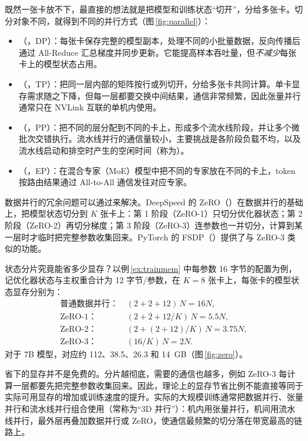 既然一张卡放不下，最直接的想法就是把模型和训练状态“切开”，分给多张卡。切分对象不同，就得到不同的并行方式（图\,\ref{fig:parallel}）：
\begin{itemize}
  \item {}（，DP）：每张卡保存完整的模型副本，处理不同的小批量数据，反向传播后通过 All-Reduce 汇总梯度并同步更新。它能提高样本吞吐量，但\emph{不减少}每张卡上的模型状态占用。
  \item {}（，TP）：把同一层内部的矩阵按行或列切开，分给多张卡共同计算\cite{shoeybi2019megatron}。单卡显存需求随之下降，但每一层都要交换中间结果，通信非常频繁，因此张量并行通常只在 NVLink 互联的单机内使用。
  \item {}（，PP）：把不同的层分配到不同的卡上，形成多个流水线阶段，并让多个微批次交错执行。流水线并行的通信量较小，主要挑战是各阶段负载不均，以及流水线启动和排空时产生的空闲时间（称为）。
  \item {}（，EP）：在混合专家（MoE）模型中把不同的专家放在不同的卡上，token 按路由结果通过 All-to-All 通信发往对应专家。
\end{itemize}



数据并行的冗余问题可以通过来解决。DeepSpeed 的 ZeRO（）\cite{rajbhandari2020zero}在数据并行的基础上，把模型状态切分到 $K$ 张卡上：第 1 阶段（ZeRO-1）只切分优化器状态；第 2 阶段（ZeRO-2）再切分梯度；第 3 阶段（ZeRO-3）连参数也一并切分，计算到某一层时才临时把完整参数收集回来。PyTorch 的 FSDP（）提供了与 ZeRO-3 类似的功能。

状态分片究竟能省多少显存？以例\,\ref{ex:trainmem} 中每参数 16 字节的配置为例，记优化器状态与主权重合计为 12 字节/参数，在 $K=8$ 张卡上，每张卡的模型状态显存分别为：
\begin{align*}
  \text{普通数据并行：} &\ (2+2+12)\,N = 16N, \\
  \text{ZeRO-1：} &\ (2+2+12/K)\,N = 5.5N, \\
  \text{ZeRO-2：} &\ (2+(2+12)/K)\,N = 3.75N, \\
  \text{ZeRO-3：} &\ (16/K)\,N = 2N.
\end{align*}
对于 7B 模型，对应约 112、38.5、26.3 和 \SI{14}{GB}（图\,\ref{fig:zero}）。



省下的显存并不是免费的。分片越彻底，需要的通信也越多，例如 ZeRO-3 每计算一层都要先把完整参数收集回来。因此，理论上的显存节省比例不能直接等同于实际可用显存的增加或训练速度的提升。实际的大规模训练通常把数据并行、张量并行和流水线并行组合使用（常称为“3D 并行”）：机内用张量并行，机间用流水线并行，最外层再叠加数据并行或 ZeRO，使通信最频繁的切分落在带宽最高的链路上。

